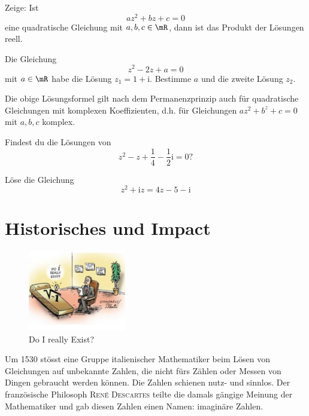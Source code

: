 \documentclass[%
11pt,%
twoside,%
titlepage,%
german,%
headsepline%
]{scrartcl}
\begin{document}
\begin{ueb}
Zeige: Ist
$$az^2+bz+c=0$$
eine quadratische Gleichung mit $a,b,c\in\mR$, dann ist das Produkt der L\"osungen reell.
\end{ueb}

\begin{ueb}[umgekehrt]
Die Gleichung
$$z^2-2z+a=0$$
mit $a\in\mR$ habe die L\"osung $z_1=1+\mathrm{i}.$ Bestimme $a$ und die zweite L\"osung $z_2$.
\end{ueb}

\begin{bem}
Die obige L\"osungsformel gilt nach dem Permanenzprinzip auch f\"ur quadratische Gleichungen mit komplexen Koeffizienten, d.h. f\"ur Gleichungen $az^2 + b^z + c = 0$ mit $a, b, c$ komplex.
\end{bem}

\begin{ueb}
Findest du die L\"osungen von
$$z^2-z+\frac{1}{4}-\frac{1}{2}\mathrm{i}=0?$$
\end{ueb}

\begin{ueb}
Löse die Gleichung
$$z^2+\mathrm{i}z=4z-5-\mathrm{i}$$
\end{ueb}

\newpage

\appendix

\section{Historisches und Impact}
\begin{figure}
\vspace{-15pt}
  \begin{center}
    \includegraphics[width=0.38\textwidth]{pictures/doiexist}
  \end{center}
\caption{\glqq Do I really Exist?\grqq}
\end{figure}
Um 1530 st\"osst eine Gruppe italienischer Mathematiker beim L\"osen von Gleichungen auf unbekannte Zahlen, die nicht f\"urs Zählen oder Messen von Dingen gebraucht werden k\"onnen.
Die Zahlen schienen nutz- und sinnlos. Der franz\"osische Philosoph \textsc{René Descartes} teilte die damals gängige Meinung der Mathematiker und gab diesen Zahlen einen Namen: imaginäre Zahlen.
\end{document}
